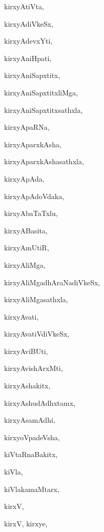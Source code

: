 \begin{multicols}{2}
{kirxyAtiVta}, \pageref{kirxyAtiVta}

{kirxyAdiVkeSx}, \pageref{kirxyAdiVkeSx}

{kirxyAdevxYti}, \pageref{kirxyAdevxYti}

{kirxyAniHpati}, \pageref{kirxyAniHpati}

{kirxyAniSapxtitx}, \pageref{kirxyAniSapxtitx}

{kirxyAniSapxtitxliMga}, \pageref{kirxyAniSapxtitxliMga}

{kirxyAniSapxtitxsathxla}, \pageref{kirxyAniSapxtitxsathxla}

{kirxyApaRNa}, \pageref{kirxyApaRNa}

{kirxyAparxkAsha}, \pageref{kirxyAparxkAsha}

{kirxyAparxkAshasathxla}, \pageref{kirxyAparxkAshasathxla}

{kirxyApAda}, \pageref{kirxyApAda}

{kirxyApAdoVdaka}, \pageref{kirxyApAdoVdaka}

{kirxyAbaTaTxlu}, \pageref{kirxyAbaTaTxlu}

{kirxyABasita}, \pageref{kirxyABasita}

{kirxyAmUtiR}, \pageref{kirxyAmUtiR}

{kirxyAliMga}, \pageref{kirxyAliMga}

{kirxyAliMgadhAraNadiVkeSx}, \pageref{kirxyAliMgadhAraNadiVkeSx}

{kirxyAliMgasathxla}, \pageref{kirxyAliMgasathxla}

{kirxyAvati}, \pageref{kirxyAvati}

{kirxyAvatiVdiVkeSx}, \pageref{kirxyAvatiVdiVkeSx}

{kirxyAviBUti}, \pageref{kirxyAviBUti}

{kirxyAvishArxMti}, \pageref{kirxyAvishArxMti}

{kirxyAshakitx}, \pageref{kirxyAshakitx}

{kirxyAshudAdhxtamx}, \pageref{kirxyAshudAdhxtamx}

{kirxyAsamAdhi}, \pageref{kirxyAsamAdhi}

{kirxyoVpadeVsha}, \pageref{kirxyoVpadeVsha}

{kiVtaRnaBakitx}, \pageref{kiVtaRnaBakitx}

{kiVla}, \pageref{kiVla}

{kiVlakamaMtarx}, \pageref{kiVlakamaMtarx}

{kirxV}, \pageref{kirxV}

{kirxV, kirxye}, \pageref{kirxV, kirxye}


\end{multicols}
